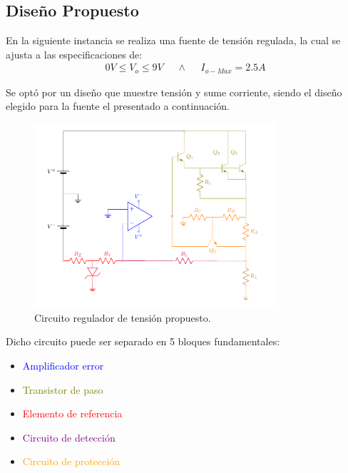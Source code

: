 



\tableofcontents
\newpage
\subsection{Diseño Propuesto}

En la siguiente instancia se realiza una fuente de tensión regulada, la cual se ajusta a las especificaciones de:
\begin{align}
0V \leq V_o \leq 9V \ \ \ \ \ \ \wedge \ \ \ \ \ \ I_{o-Max}=2.5A
\end{align}

Se optó por un diseño que muestre tensión y sume corriente, siendo el diseño elegido para la fuente el presentado a continuación.
\begin{figure}[H]
\centering
	\includegraphics[width=0.8\textwidth, page=1]{ImagenesEjercicio2/Regulador.pdf}
	\caption{Circuito regulador de tensión propuesto.}
	\label{fig:circuitoprop}
\end{figure}

Dicho circuito puede ser separado en 5 bloques fundamentales:
\begin{itemize}
\item \textcolor{blue}{Amplificador error}
\item \textcolor{olive}{Transistor de paso}
\item \textcolor{red}{Elemento de referencia}
\item \textcolor{purple}{Circuito de detección}
\item \textcolor{orange}{Circuito de protección}
\end{itemize}

 


